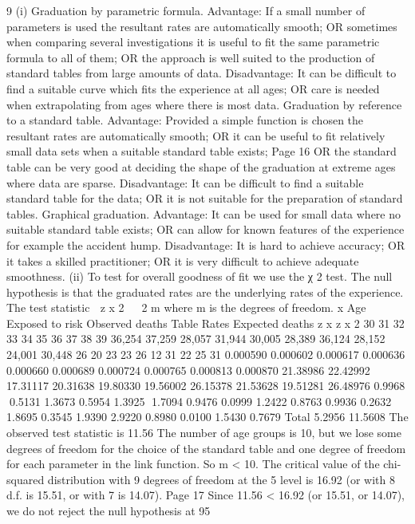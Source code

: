 9
(i)
Graduation by parametric formula.
Advantage: If a small number of parameters is used the resultant rates are
automatically smooth;
OR sometimes when comparing several investigations it is useful to fit the same
parametric formula to all of them;
OR the approach is well suited to the production of standard tables from large
amounts of data.
Disadvantage: It can be difficult to find a suitable curve which fits the experience at
all ages;
OR care is needed when extrapolating from ages where there is most data.
Graduation by reference to a standard table.
Advantage: Provided a simple function is chosen the resultant rates are automatically
smooth;
OR it can be useful to fit relatively small data sets when a suitable standard table
exists;
Page 16%
OR the standard table can be very good at deciding the shape of the graduation at
extreme ages where data are sparse.
Disadvantage: It can be difficult to find a suitable standard table for the data;
OR it is not suitable for the preparation of standard tables.
Graphical graduation.
Advantage: It can be used for small data where no suitable standard table exists;
OR can allow for known features of the experience for example the accident hump.
Disadvantage: It is hard to achieve accuracy;
OR it takes a skilled practitioner;
OR it is very difficult to achieve adequate smoothness.
(ii)
To test for overall goodness of fit we use the χ 2 test.
The null hypothesis is that the graduated rates are the underlying rates of the
experience.
The test statistic  z x 2   2 m where m is the degrees of freedom.
x
Age Exposed
to risk Observed
deaths Table
Rates Expected
deaths z x z x 2
30
31
32
33
34
35
36
37
38
39 36,254
37,259
28,057
31,944
30,005
28,389
36,124
28,152
24,001
30,448 26
20
23
23
26
12
31
22
25
31 0.000590
0.000602
0.000617
0.000636
0.000660
0.000689
0.000724
0.000765
0.000813
0.000870 21.38986
22.42992
17.31117
20.31638
19.80330
19.56002
26.15378
21.53628
19.51281
26.48976 0.9968
0.5131
1.3673
0.5954
1.3925
1.7094
0.9476
0.0999
1.2422
0.8763 0.9936
0.2632
1.8695
0.3545
1.9390
2.9220
0.8980
0.0100
1.5430
0.7679
Total 5.2956 11.5608
The observed test statistic is 11.56
The number of age groups is 10, but we lose some degrees of freedom for the choice
of the standard table and one degree of freedom for each parameter in the link
function. So m < 10.
The critical value of the chi-squared distribution with 9 degrees of freedom at the 5%
level is 16.92 (or with 8 d.f. is 15.51, or with 7 is 14.07).
Page 17%
Since 11.56 < 16.92 (or 15.51, or 14.07), we do not reject the null hypothesis at 95%
